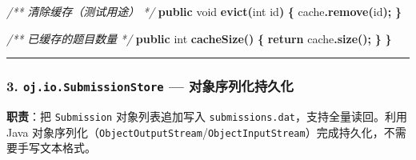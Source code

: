 \documentclass[
  11pt,
]{ctexart}
\newenvironment{Shaded}{\begin{snugshade}}{\end{snugshade}}
\newcommand{\CommentTok}[1]{\textcolor[rgb]{0.56,0.35,0.01}{\textit{#1}}}
\newcommand{\ControlFlowTok}[1]{\textcolor[rgb]{0.13,0.29,0.53}{\textbf{#1}}}
\newcommand{\DataTypeTok}[1]{\textcolor[rgb]{0.13,0.29,0.53}{#1}}
\newcommand{\FunctionTok}[1]{\textcolor[rgb]{0.13,0.29,0.53}{\textbf{#1}}}
\newcommand{\KeywordTok}[1]{\textcolor[rgb]{0.13,0.29,0.53}{\textbf{#1}}}
\newcommand{\NormalTok}[1]{#1}
\newcommand{\OperatorTok}[1]{\textcolor[rgb]{0.81,0.36,0.00}{\textbf{#1}}}
\begin{document}
\begin{Shaded}
\begin{Highlighting}[]
    \CommentTok{/**} \CommentTok{清除缓存（测试用途）} \CommentTok{*/}
    \KeywordTok{public} \DataTypeTok{void} \FunctionTok{evict}\OperatorTok{(}\DataTypeTok{int}\NormalTok{ id}\OperatorTok{)} \OperatorTok{\{}
\NormalTok{        cache}\OperatorTok{.}\FunctionTok{remove}\OperatorTok{(}\NormalTok{id}\OperatorTok{);}
    \OperatorTok{\}}

    \CommentTok{/**} \CommentTok{已缓存的题目数量} \CommentTok{*/}
    \KeywordTok{public} \DataTypeTok{int} \FunctionTok{cacheSize}\OperatorTok{()} \OperatorTok{\{}
        \ControlFlowTok{return}\NormalTok{ cache}\OperatorTok{.}\FunctionTok{size}\OperatorTok{();}
    \OperatorTok{\}}
\OperatorTok{\}}
\end{Highlighting}
\end{Shaded}

\begin{center}\rule{0.5\linewidth}{0.5pt}\end{center}

\hypertarget{oj.io.submissionstore-ux5bf9ux8c61ux5e8fux5217ux5316ux6301ux4e45ux5316}{%
\subsubsection{\texorpdfstring{3. \texttt{oj.io.SubmissionStore} ---
对象序列化持久化}{3. oj.io.SubmissionStore --- 对象序列化持久化}}\label{oj.io.submissionstore-ux5bf9ux8c61ux5e8fux5217ux5316ux6301ux4e45ux5316}}

\textbf{职责}：把 \texttt{Submission} 对象列表追加写入
\texttt{submissions.dat}，支持全量读回。利用 Java
对象序列化（\texttt{ObjectOutputStream}/\texttt{ObjectInputStream}）完成持久化，不需要手写文本格式。
\end{document}
